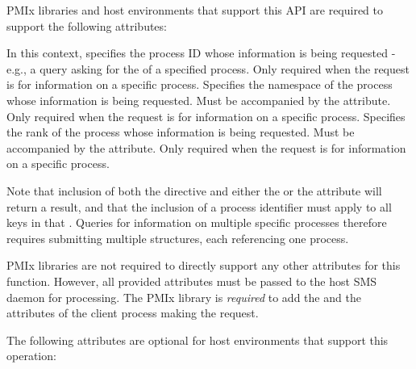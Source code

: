 \reqattrstart
\ac{PMIx} libraries and host environments that support this \ac{API} are required to support the following attributes:

In this context, specifies the process ID whose information is being requested - e.g., a query asking for the  of a specified process. Only required when the request is for information on a specific process.
\pasteAttributeItemEnd
{}Specifies the namespace of the process whose information is being requested. Must be accompanied by the  attribute. Only required when the request is for information on a specific process.
\pasteAttributeItemEnd
{}Specifies the rank of the process whose information is being requested. Must be accompanied by the  attribute. Only required when the request is for information on a specific process.
\pasteAttributeItemEnd
{}

Note that inclusion of both the  directive and either the  or the  attribute will return a  result, and that the inclusion of a process identifier must apply to all keys in that . Queries for information on multiple specific processes therefore requires submitting multiple  structures, each referencing one process.

\ac{PMIx} libraries are not required to directly support any other attributes for this function. However, all provided attributes must be passed to the host \ac{SMS} daemon for processing. The \ac{PMIx} library is \textit{required} to add the  and the  attributes of the client process making the request.

\reqattrend


\optattrstart
The following attributes are optional for host environments that support this operation:

